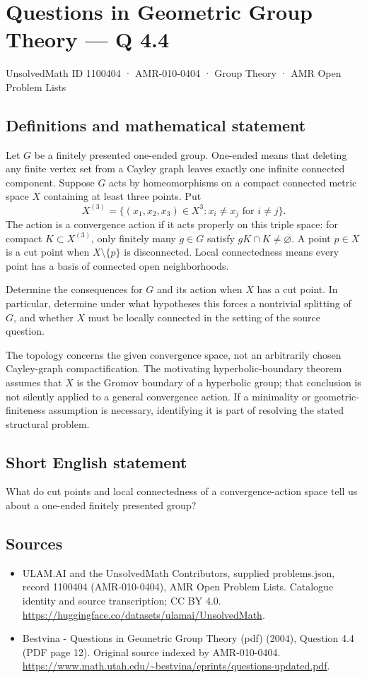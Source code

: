 \documentclass[11pt,a4paper]{article}
\begin{document}
\section*{Questions in Geometric Group Theory — Q 4.4}\label{1100404}
{\small UnsolvedMath ID 1100404 · AMR-010-0404 · Group Theory · AMR Open Problem Lists}
\subsection{Definitions and mathematical statement}
Let $G$ be a finitely presented one-ended group. One-ended means that deleting any finite vertex set from a Cayley graph leaves exactly one infinite connected component. Suppose $G$ acts by homeomorphisms on a compact connected metric space $X$ containing at least three points. Put
\[
 X^{(3)}=\{(x_1,x_2,x_3)\in X^3:x_i\ne x_j\text{ for }i\ne j\}.
\]
The action is a convergence action if it acts properly on this triple space: for compact $K\subset X^{(3)}$, only finitely many $g\in G$ satisfy $gK\cap K\ne\varnothing$. A point $p\in X$ is a cut point when $X\setminus\{p\}$ is disconnected. Local connectedness means every point has a basis of connected open neighborhoods.

Determine the consequences for $G$ and its action when $X$ has a cut point. In particular, determine under what hypotheses this forces a nontrivial splitting of $G$, and whether $X$ must be locally connected in the setting of the source question.

The topology concerns the given convergence space, not an arbitrarily chosen Cayley-graph compactification. The motivating hyperbolic-boundary theorem assumes that $X$ is the Gromov boundary of a hyperbolic group; that conclusion is not silently applied to a general convergence action. If a minimality or geometric-finiteness assumption is necessary, identifying it is part of resolving the stated structural problem.
\subsection{Short English statement}
What do cut points and local connectedness of a convergence-action space tell us about a one-ended finitely presented group?
\subsection{Sources}
\begin{itemize}
\item[S1] ULAM.AI and the UnsolvedMath Contributors, supplied problems.json, record 1100404 (AMR-010-0404), AMR Open Problem Lists. Catalogue identity and source transcription; CC BY 4.0.
\url{https://huggingface.co/datasets/ulamai/UnsolvedMath}.
\item[S2] Bestvina - Questions in Geometric Group Theory (pdf) (2004), Question 4.4 (PDF page 12). Original source indexed by AMR-010-0404.
\url{https://www.math.utah.edu/~bestvina/eprints/questions-updated.pdf}.
\end{itemize}
\end{document}
